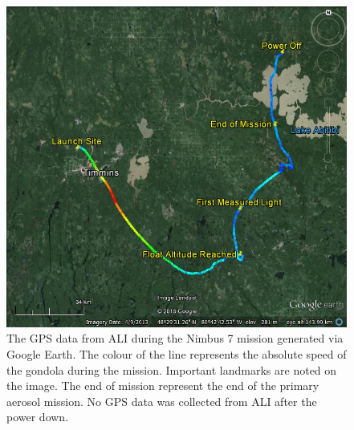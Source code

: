 \documentclass[12pt]{article}
\begin{document}
\newpage

\begin{figure}
    \includegraphics[width=1.0\textwidth]{./Images/5-1-AliGpsDataGoogleMaps.jpg}
    \caption{The GPS data from ALI during the Nimbus 7 mission generated via Google Earth. The colour of the line represents the absolute speed of the gondola during the mission. Important landmarks are noted on the image. The end of mission represent the end of the primary aerosol mission. No GPS data was collected from ALI after the power down.}
    \label{fig:5.1:nimbus7FlightPath}
\end{figure}

\newpage
\end{document}
